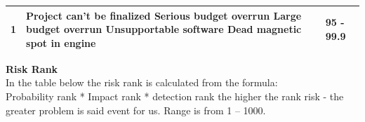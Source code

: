 \documentclass[12pt,a4paper]{report}
\begin{document}
\begin{tabular}{|l|p{10cm}|p{4cm}|}
\hline 1 & Project can’t be finalized\newline
Serious budget overrun\newline
Large budget overrun\newline
Unsupportable software\newline
Dead magnetic spot in engine & 95 - 99.9 \\ 

\hline 
\end{tabular} 


\textbf{Risk Rank}\\

In the table below the risk rank is calculated from the formula:
\\
Probability rank * Impact rank * detection rank the higher the rank risk - the greater problem is said event for us. Range is from 1 – 1000.\\
\noindent
\end{document}
